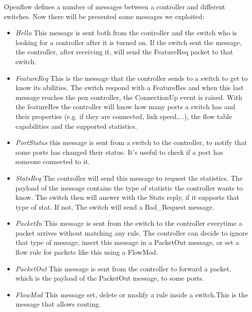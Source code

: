 \documentclass[article,10pt]{IEEEtran}
\begin{document}
Openflow defines a number of messages between a controller and different switches. Now there will be presented some messages we exploited\cite{openflow}:
\begin{itemize}

\item \emph{Hello} \newline This message is sent both from the controller and the switch who is looking for a controller after it
	is turned on. If the switch sent the message, the controller, after receiving it, will send the FeatureReq packet to that switch.
\item \emph{FeatureReq} \newline This is the message that the controller sends to a switch to get to know its abilities. The switch
	respond with a FeatureRes and when this last message reaches the pox controller, the ConnectionUp event is raised.
	With the featureRes the controller will know how many ports a switch has and their properties (e.g. if they are connected, link speed,...), the flow table capabilities and the supported statistics.
\item \emph{PortStatus} \newline this message is sent from a switch to the controller, to notify that some ports has changed their status.
		It's useful to check if a port has someone connected to it.
\item \emph{StatsReq} \newline The controller will send this message to request the statistics. The payload of the message contains the type of 
statistic the controller wants to know.
		The switch then will answer with the Stats reply, if it supports that type of stat. If not, The switch will send a Bad_Request
		message.
\item \emph{PacketIn} \newline This message is sent from the switch to the controller everytime a packet arrives without matching any rule.
The controller can decide to ignore that type of message, insert this message in a PacketOut message, or set
		a flow rule for packets like this using a FlowMod.
\item \emph{PacketOut} \newline This message is sent from the controller to forward a packet, which is the payload of the PacketOut message,
to some ports.
\item \emph{FlowMod} \newline This message set, delete or modify a rule inside a switch.This is the message that allows routing.
\\
\\
\end{itemize}
\end{document}
